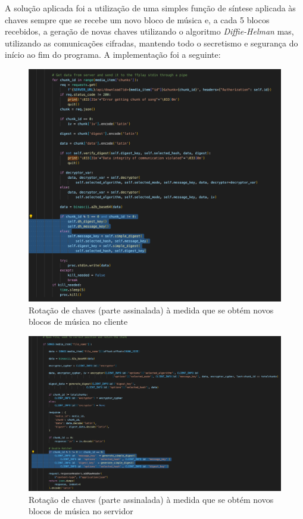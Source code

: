 \documentclass[10pt,english]{article}
\begin{document}
\begin{itemize}
\par A solução aplicada foi a utilização de uma simples função de síntese aplicada às chaves sempre que se recebe um novo bloco de música e, a cada 5 blocos recebidos, a geração de novas chaves utilizando o algoritmo \textit{Diffie-Helman} mas, utilizando as comunicações cifradas, mantendo todo o secretismo e segurança do início ao fim do programa. A implementação foi a seguinte:

\begin{figure}[!h]
        \centering
        \includegraphics[width=450]{images/download_rotation_client.png}
        \caption{Rotação de chaves (parte assinalada) à medida que se obtém novos blocos de música no cliente}
\end{figure}

\begin{figure}[!h]
        \centering
        \includegraphics[width=450]{images/download_rotation_server.png}
        \caption{Rotação de chaves (parte assinalada) à medida que se obtém novos blocos de música no servidor}
\end{figure}


\end{itemize}
\end{document}
